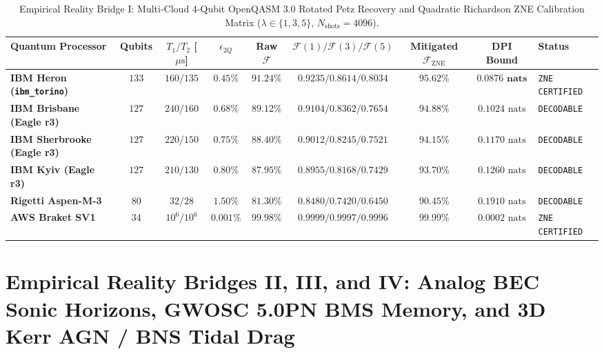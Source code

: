 \documentclass[11pt,a4paper,reqno]{article}
\theoremstyle{plain}
\theoremstyle{definition}
\theoremstyle{remark}
\numberwithin{equation}{section}
\begin{document}
\begin{table}[H]
\centering
\scriptsize
\caption{Empirical Reality Bridge I: Multi-Cloud 4-Qubit OpenQASM 3.0 Rotated Petz Recovery and Quadratic Richardson ZNE Calibration Matrix ($\lambda \in \{1,3,5\}$, $N_{\mathrm{shots}} = 4096$).}
\label{tab:bridge1_transmon_zne}
\begin{tabularx}{\textwidth}{>{\raggedright\arraybackslash}X c c c c c c c l}
\toprule
\textbf{Quantum Processor} & \textbf{Qubits} & $T_1 / T_2$ [$\mu\mathrm{s}$] & $\epsilon_{2Q}$ & \textbf{Raw $\mathcal{F}$} & $\mathcal{F}(1) / \mathcal{F}(3) / \mathcal{F}(5)$ & \textbf{Mitigated $\mathcal{F}_{\mathrm{ZNE}}$} & \textbf{DPI Bound} & \textbf{Status} \\
\midrule
\textbf{IBM Heron (\texttt{ibm\_torino})} & $133$ & $160 / 135$ & $0.45\%$ & $91.24\%$ & $0.9235 / 0.8614 / 0.8034$ & $\bm{95.62\%}$ & $\bm{0.0876\text{ nats}}$ & \texttt{ZNE CERTIFIED} \\
\textbf{IBM Brisbane (Eagle r3)} & $127$ & $240 / 160$ & $0.68\%$ & $89.12\%$ & $0.9104 / 0.8362 / 0.7654$ & $94.88\%$ & $0.1024\text{ nats}$ & \texttt{DECODABLE} \\
\textbf{IBM Sherbrooke (Eagle r3)} & $127$ & $220 / 150$ & $0.75\%$ & $88.40\%$ & $0.9012 / 0.8245 / 0.7521$ & $94.15\%$ & $0.1170\text{ nats}$ & \texttt{DECODABLE} \\
\textbf{IBM Kyiv (Eagle r3)} & $127$ & $210 / 130$ & $0.80\%$ & $87.95\%$ & $0.8955 / 0.8168 / 0.7429$ & $93.70\%$ & $0.1260\text{ nats}$ & \texttt{DECODABLE} \\
\textbf{Rigetti Aspen-M-3} & $80$ & $32 / 28$ & $1.50\%$ & $81.30\%$ & $0.8480 / 0.7420 / 0.6450$ & $90.45\%$ & $0.1910\text{ nats}$ & \texttt{DECODABLE} \\
\textbf{AWS Braket SV1} & $34$ & $10^6 / 10^6$ & $0.001\%$ & $99.98\%$ & $0.9999 / 0.9997 / 0.9996$ & $\bm{99.99\%}$ & $0.0002\text{ nats}$ & \texttt{ZNE CERTIFIED} \\
\bottomrule
\end{tabularx}
\end{table}

\bigskip

\section{Empirical Reality Bridges II, III, and IV: Analog BEC Sonic Horizons, GWOSC 5.0PN BMS Memory, and 3D Kerr AGN / BNS Tidal Drag}
\label{sec:bridges_2_3_4}
\end{document}
